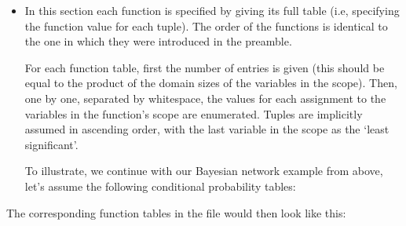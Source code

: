 \documentclass[letterpaper,10pt,openany,oneside,english]{sphinxmanual}
\begin{document}
\begin{itemize}
\item {} 
\sphinxAtStartPar
{}

\sphinxAtStartPar
In this section each function is specified by giving its full table (i.e, specifying the function value for each tuple). The order of the functions is identical to the one in which they were introduced in the preamble.

\sphinxAtStartPar
For each function table, first the number of entries is given (this should be equal to the product of the domain sizes of the variables in the scope). Then, one by one, separated by whitespace, the values for each assignment to the variables in the function’s scope are enumerated. Tuples are implicitly assumed in ascending order, with the last variable in the scope as the ‘least significant’.

\sphinxAtStartPar
To illustrate, we continue with our Bayesian network example from above, let’s assume the following conditional probability tables:

\begin{sphinxVerbatim}[commandchars=\\\{\}]
      
      
      

                 
               
               
               
               

                 
               
               
               
               
               
               
\end{sphinxVerbatim}

\end{itemize}

\sphinxAtStartPar
The corresponding function tables in the file would then look like this:

\begin{sphinxVerbatim}[commandchars=\\\{\}]
  

  
  

   
   
\end{sphinxVerbatim}
\end{document}
